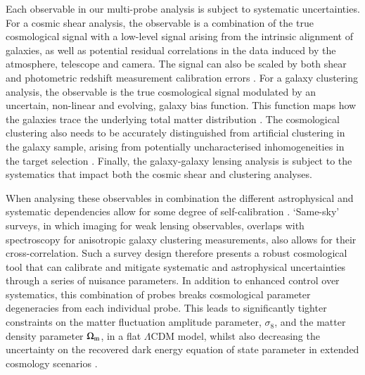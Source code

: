 Each observable in our multi-probe analysis is subject to systematic
uncertainties.  For a cosmic shear analysis, the observable is a
combination of the true cosmological signal with a low-level signal
arising from the intrinsic alignment of galaxies, as well as potential residual
correlations in the data induced by the atmosphere, telescope and
camera.   The signal can also be scaled by both shear
 and photometric redshift measurement calibration errors
 \citep[see][and references therein]{mandelbaum:2018}.   For a galaxy
   clustering analysis, the observable is the true
   cosmological signal modulated by an uncertain, non-linear and
   evolving, galaxy bias function.  This function maps how
   the galaxies trace the
   underlying total matter distribution \citep[see][and references
   therein]{desjacques/etal:2018}. 
   The cosmological clustering
   also needs to be accurately distinguished from artificial clustering in the galaxy sample,
   arising from potentially uncharacterised inhomogeneities in the target selection \citep[see for example][]{ross/etal:2012}. 
   Finally, the galaxy-galaxy
   lensing analysis is subject to the systematics that impact both the
   cosmic shear and clustering analyses.

   When analysing these
   observables in combination
   the different astrophysical and systematic dependencies allow for some degree of
   self-calibration \citep{bernstein/jain:2004, hu/jain:2004,
     bernstein:2009,joachimi/bridle:2010}.  `Same-sky'
   surveys, in which imaging for weak lensing observables, overlaps with
   spectroscopy for anisotropic galaxy clustering measurements,
   also allows for their cross-correlation.  Such a survey design therefore
   presents a robust
   cosmological tool that can calibrate and mitigate systematic and astrophysical
   uncertainties through a series of nuisance parameters.   In
   addition to enhanced control over systematics, this combination of probes
   breaks cosmological parameter degeneracies from each individual
   probe. 
   This leads to significantly tighter constraints on the matter fluctuation amplitude 
   parameter, $\sigma_8$, and the matter density parameter $\Omega_{\rm m}$, in a flat $\Lambda$CDM model, whilst also decreasing the
   uncertainty on the recovered dark energy equation of state
   parameter in extended cosmology scenarios \citep{hu/jain:2004,gaztanaga/etal:2012}.
   
